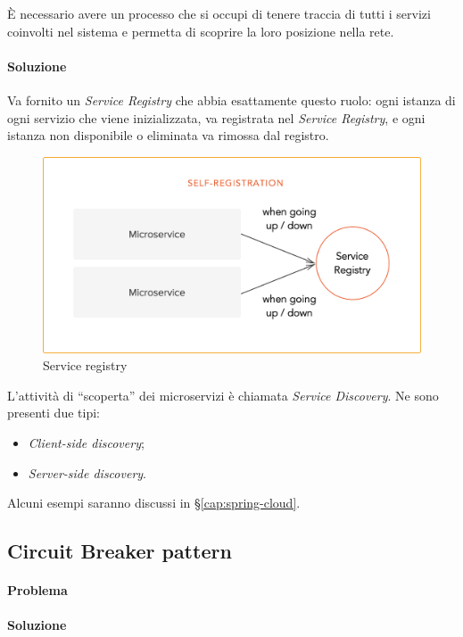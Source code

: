 È necessario avere un processo che si occupi di tenere traccia di tutti i servizi coinvolti nel sistema e permetta di scoprire la loro posizione nella rete.

\paragraph*{Soluzione} Va fornito un \textit{Service Registry} che abbia esattamente questo ruolo:
ogni istanza di ogni servizio che viene inizializzata, va registrata nel \textit{Service Registry}, e ogni istanza non disponibile o eliminata va rimossa dal registro.

\begin{figure}[H]
	\centering
	\includegraphics[width=\textwidth]{immagini/service-registry.png}
	\caption[Esempio di Saga pattern]{Service registry\footnotemark}
\end{figure}

L'attività di ``scoperta'' dei microservizi è chiamata \textit{Service Discovery}. Ne sono presenti due tipi:
\begin{itemize}
	\item \textit{Client-side discovery};
	\item \textit{Server-side discovery}.
\end{itemize}
Alcuni esempi saranno discussi in \S\ref{cap:spring-cloud}.


\subsection{Circuit Breaker pattern}\label{circuit-breaker}

\paragraph*{Problema}

\paragraph*{Soluzione}